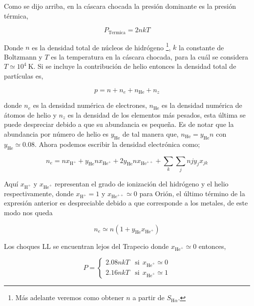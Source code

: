 \documentclass{article}
\newcommand\U[1]{\ensuremath{\mathrm{#1}}}
\newcommand\K{\U{K}}
\newcommand\ha{\ensuremath{\mathrm{H}\alpha}}
\begin{document}
Como se dijo arriba, en la cáscara chocada la presión dominante es la presión térmica,

\begin{equation}
  \label{eq:presion-cascara}
  P_{\text{Termica}}=2 n k T 
\end{equation}
 
Donde \(n\) es la densidad total de núcleos de hidrógeno \footnote{Más adelante veremos como obtener \(n\) a partir de \(S_{\ha{}}\). }, \(k\) la constante de Boltzmann y \(T\) es la temperatura en la cáscara chocada, para la cuál se considera \(T\simeq10^{4}~\K\). Si se incluye la contribución de helio entonces la densidad total de partículas es,

\begin{equation*}
  \label{eq:particulas}
  p = n + n_{e} + n_{\text{He}} + n_{z}
\end{equation*}

donde \(n_{e}\) es la densidad numérica de electrones, \(n_{\text{He}}\) es la densidad numérica de átomos de helio y \(n_{z}\) es la densidad de los elementos más pesados, esta última se puede despreciar debido a que su abundancia es pequeña. Es de notar que la abundancia por número de helio es \(y_{\text{He}}\) de tal manera que, \(n_{\text{He}} = y_{\text{He}} n\) con \(y_{\text{He}} \simeq 0.08\). Ahora podemos escribir la densidad electrónica como;

\begin{equation*}
  \label{eq:densidad-electronica}
  n_{e}=nx_{\text{H}^{+}} + y_{\text{He}}nx_{\text{He}^{+}} + 2 y_{\text{He}}nx_{\text{He}^{++}} + \sum_{k} \sum_{j}njy_{j}x_{jk}
\end{equation*}

Aquí \(x_{\text{H}^{+}}\) y \(x_{\text{He}^{+}}\) representan el grado de ionización del hidrógeno y el helio respectivamente, donde \(x_{\text{H}^{+}}=1\) y \(x_{\text{He}^{++}} \simeq 0\) para Orión, el último término de la expresión anterior es despreciable debido a que corresponde a los metales, de este modo nos queda

\begin{equation*}
  \label{eq:density}
  n_{e} \simeq n(1 +  y_{\text{He}}x_{\text{He}^{+}})
\end{equation*}

 Los choques LL se encuentran lejos del Trapecio donde \(x_{\text{He}^{+}} \simeq 0\) entonces,

\begin{equation}
  \label{eq:pressure}
  P =  \left\{ \begin{array}{ll}
  2.08 n k T  & \mathrm{si} ~~ \mbox{$x_{\text{He}^{+}} \simeq 0$}\\
  2.16 n k T  & \mathrm{si} ~~ \mbox{$x_{\text{He}^{+}} \simeq 1$}
 \end{array}
 \right.
\end{equation}
\end{document}
